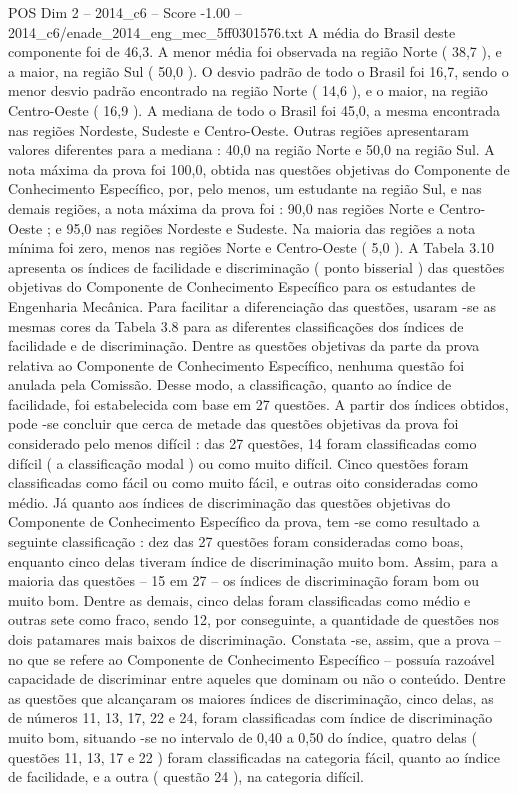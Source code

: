\begin{textsample}{POS Dim 2 – 2014\_c6 – Score -1.00 – 2014\_c6/enade\_2014\_eng\_mec\_5ff0301576.txt}
A média do Brasil deste componente foi de 46,3.
A menor média foi observada na região Norte ( 38,7 ), e a maior, na região Sul ( 50,0 ).
O desvio padrão de todo o Brasil foi 16,7, sendo o menor desvio padrão encontrado na região Norte ( 14,6 ), e o maior, na região Centro-Oeste ( 16,9 ).
A mediana de todo o Brasil foi 45,0, a mesma encontrada nas regiões Nordeste, Sudeste e Centro-Oeste.
Outras regiões apresentaram valores diferentes para a mediana : 40,0 na região Norte e 50,0 na região Sul.
A nota máxima da prova foi 100,0, obtida nas questões objetivas do Componente de Conhecimento Específico, por, pelo menos, um estudante na região Sul, e nas demais regiões, a nota máxima da prova foi : 90,0 nas regiões Norte e Centro-Oeste ; e 95,0 nas regiões Nordeste e Sudeste.
Na maioria das regiões a nota mínima foi zero, menos nas regiões Norte e Centro-Oeste ( 5,0 ).
A Tabela 3.10 apresenta os índices de facilidade e discriminação ( ponto bisserial ) das questões objetivas do Componente de Conhecimento Específico para os estudantes de Engenharia Mecânica.
Para facilitar a diferenciação das questões, usaram -se as mesmas cores da Tabela 3.8 para as diferentes classificações dos índices de facilidade e de discriminação.
Dentre as questões objetivas da parte da prova relativa ao Componente de Conhecimento Específico, nenhuma questão foi anulada pela Comissão.
Desse modo, a classificação, quanto ao índice de facilidade, foi estabelecida com base em 27 questões.
A partir dos índices obtidos, pode -se concluir que cerca de metade das questões objetivas da prova foi considerado pelo menos difícil : das 27 questões, 14 foram classificadas como difícil ( a classificação modal ) ou como muito difícil.
Cinco questões foram classificadas como fácil ou como muito fácil, e outras oito consideradas como médio.
Já quanto aos índices de discriminação das questões objetivas do Componente de Conhecimento Específico da prova, tem -se como resultado a seguinte classificação : dez das 27 questões foram consideradas como boas, enquanto cinco delas tiveram índice de discriminação muito bom.
Assim, para a maioria das questões – 15 em 27 – os índices de discriminação foram bom ou muito bom.
Dentre as demais, cinco delas foram classificadas como médio e outras sete como fraco, sendo 12, por conseguinte, a quantidade de questões nos dois patamares mais baixos de discriminação.
Constata -se, assim, que a prova – no que se refere ao Componente de Conhecimento Específico – possuía razoável capacidade de discriminar entre aqueles que dominam ou não o conteúdo.
Dentre as questões que alcançaram os maiores índices de discriminação, cinco delas, as de números 11, 13, 17, 22 e 24, foram classificadas com índice de discriminação muito bom, situando -se no intervalo de 0,40 a 0,50 do índice, quatro delas ( questões 11, 13, 17 e 22 ) foram classificadas na categoria fácil, quanto ao índice de facilidade, e a outra ( questão 24 ), na categoria difícil.

\end{textsample}
